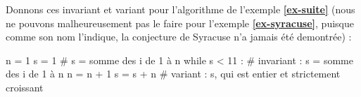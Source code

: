 Donnons ces invariant et variant pour l'algorithme de l'exemple \textbf{\ref{ex-suite}} (nous ne 
pouvons malheureusement pas le faire pour l'exemple \textbf{\ref{ex-syracuse}}, puisque comme son 
nom l'indique, la conjecture de Syracuse n'a jamais été demontrée) :\\

\begin{pyconsole}
n = 1
s = 1           # s = somme des i de 1 à n
while s < 11 :  # invariant : s = somme des i de 1 à n
    n = n + 1
    s = s + n   # variant : s, qui est entier et strictement croissant
\end{pyconsole}

